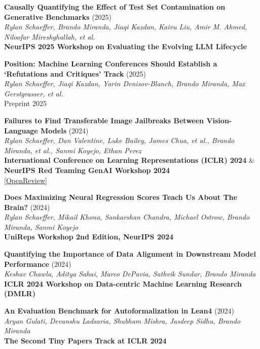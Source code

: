\documentclass{article}
\newenvironment{changemargin}[2]{%
  \begin{list}{}{%
    \setlength{\topsep}{0pt}%
    \setlength{\leftmargin}{#1}%
    \setlength{\rightmargin}{#2}%
    \setlength{\listparindent}{\parindent}%
    \setlength{\itemindent}{\parindent}%
    \setlength{\parsep}{\parskip}%
  }%
  \item[]}{\end{list}
}
\newenvironment{body} {
	\vspace*{-16pt}
	\begin{changemargin}{-0.25in}{-0.5in}
  }	
	{\end{changemargin}
}
\begin{document}
\begin{body}
    \vspace{10pt}
    \textbf{Causally Quantifying the Effect of Test Set Contamination on Generative Benchmarks} (2025)\\
    \emph{Rylan Schaeffer, Brando Miranda, Jiaqi Kazdan, Kaivu Liu, Amir M. Ahmed, Niloofar Mireshghallah, et al.}\\
    \textbf{NeurIPS 2025 Workshop on Evaluating the Evolving LLM Lifecycle}

    \vspace{10pt}
    \textbf{Position: Machine Learning Conferences Should Establish a `Refutations and Critiques' Track} (2025)\\
    \emph{Rylan Schaeffer, Jiaqi Kazdan, Yarin Denisov-Blanch, Brando Miranda, Max Gerstgrasser, et al.}\\
    Preprint 2025
    
    \vspace{10pt}
    \textbf{Failures to Find Transferable Image Jailbreaks Between Vision-Language Models} (2024)\\
    \emph{Rylan Schaeffer, Dan Valentine, Luke Bailey, James Chua, et al., Brando Miranda, et al., Sanmi Koyejo, Ethan Perez}\\
    \textbf{International Conference on Learning Representations (ICLR) 2024} \& \textbf{NeurIPS Red Teaming GenAI Workshop 2024}\\
    \href{https://openreview.net/forum?id=wvFnqVVUhN}{[OpenReview]}

    \vspace{10pt}
    \textbf{Does Maximizing Neural Regression Scores Teach Us About The Brain?} (2024)\\
    \emph{Rylan Schaeffer, Mikail Khona, Sankarshan Chandra, Michael Ostrow, Brando Miranda, Sanmi Koyejo}\\
    \textbf{UniReps Workshop 2nd Edition, NeurIPS 2024}

    \vspace{10pt}
    \textbf{Quantifying the Importance of Data Alignment in Downstream Model Performance} (2024)\\
    \emph{Keshav Chawla, Aditya Sahai, Marco DePavia, Sathvik Sundar, Brando Miranda}\\
    \textbf{ICLR 2024 Workshop on Data-centric Machine Learning Research (DMLR)}

    \vspace{10pt}
    \textbf{An Evaluation Benchmark for Autoformalization in Lean4} (2024)\\
    \emph{Aryan Gulati, Devanshu Ladsaria, Shubham Mishra, Jasdeep Sidhu, Brando Miranda}\\
    \textbf{The Second Tiny Papers Track at ICLR 2024}


\end{body}
\end{document}
